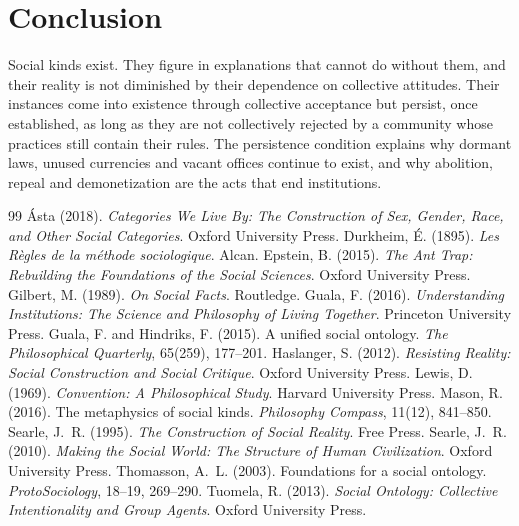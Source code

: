 \documentclass{situationist-preprint}
\begin{document}
\section{Conclusion}

Social kinds exist. They figure in explanations that cannot do without them, and their reality is not diminished by their dependence on collective attitudes. Their instances come into existence through collective acceptance but persist, once established, as long as they are not collectively rejected by a community whose practices still contain their rules. The persistence condition explains why dormant laws, unused currencies and vacant offices continue to exist, and why abolition, repeal and demonetization are the acts that end institutions.

\begin{thebibliography}{99}\small
{} {\'A}sta (2018). \emph{Categories We Live By: The Construction of Sex, Gender, Race, and Other Social Categories}. Oxford University Press.
 Durkheim, {\'E}. (1895). \emph{Les R{\`e}gles de la m{\'e}thode sociologique}. Alcan.
 Epstein, B. (2015). \emph{The Ant Trap: Rebuilding the Foundations of the Social Sciences}. Oxford University Press.
 Gilbert, M. (1989). \emph{On Social Facts}. Routledge.
 Guala, F. (2016). \emph{Understanding Institutions: The Science and Philosophy of Living Together}. Princeton University Press.
 Guala, F. and Hindriks, F. (2015). A unified social ontology. \emph{The Philosophical Quarterly}, 65(259), 177--201.
 Haslanger, S. (2012). \emph{Resisting Reality: Social Construction and Social Critique}. Oxford University Press.
 Lewis, D. (1969). \emph{Convention: A Philosophical Study}. Harvard University Press.
 Mason, R. (2016). The metaphysics of social kinds. \emph{Philosophy Compass}, 11(12), 841--850.
 Searle, J.~R. (1995). \emph{The Construction of Social Reality}. Free Press.
 Searle, J.~R. (2010). \emph{Making the Social World: The Structure of Human Civilization}. Oxford University Press.
 Thomasson, A.~L. (2003). Foundations for a social ontology. \emph{ProtoSociology}, 18--19, 269--290.
 Tuomela, R. (2013). \emph{Social Ontology: Collective Intentionality and Group Agents}. Oxford University Press.
\end{thebibliography}
\end{document}
